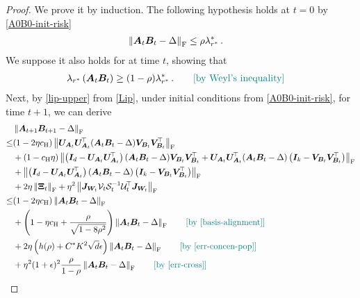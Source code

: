 \begin{proof}
We prove it by induction.
The following hypothesis holds at $t=0$ by \cref{A0B0-init-risk}
    \begin{align*}
        \left\|\bm A_t \bm B_t - \Delta\right\|_{\rm F} & \leq \rho \lambda^*_{r^*}\,.
    \end{align*}
    We suppose it also holds for at time $t$, showing that
    \begin{align*}
        \lambda_{r^*}\left(\bm A_t \bm B_t\right) & \geq (1-\rho)\lambda^*_{r^*}\,. \tag*{\color{teal}[by Weyl's inequality]}
    \end{align*}
    Next, by \cref{lip-upper} from \cref{Lip}, under initial conditions from \cref{A0B0-init-risk},  for time $t+1$, we can derive
    \begin{align*}
        & \left\|\bm A_{t+1}\bm B_{t+1} - \Delta\right\|_{\rm F}\\ 
        \leq & (1-2\eta c_{\rm H})\left\|\bm U_{\bm A_t} \bm U_{\bm A_t}^{\!\top}(\bm A_t \bm B_t - \Delta)\bm V_{\bm B_t} \bm V_{\bm B_t}^{\!\top}\right\|_{\rm F}\nonumber\\
        &  + (1-c_{\rm H}\eta) \left\|\left(\bm I_d - \bm U_{\bm A_t} \bm U_{\bm A_t}^{\!\top}\right)(\bm A_t \bm B_t - \Delta)\bm V_{\bm B_t} \bm V_{\bm B_t}^{\!\top}+\bm U_{\bm A_t} \bm U_{\bm A_t}^{\!\top}(\bm A_t \bm B_t - \Delta)\left(\bm I_k - \bm V_{\bm B_t} \bm V_{\bm B_t}^{\!\top}\right)\right\|_{\rm F}\nonumber\\
        &  + \left\|\left(\bm I_d - \bm U_{\bm A_t} \bm U_{\bm A_t}^{\!\top}\right)(\bm A_t \bm B_t - \Delta)\left(\bm I_k - \bm V_{\bm B_t} \bm V_{\bm B_t}^{\!\top}\right)\right\|_{\rm F}\nonumber\\
        &  + 2\eta\left\|\bm \Xi_t\right\|_{\rm F}+\eta^2\left\|\bm J_{\bm W_t} \mathcal{V}_t \mathcal{S}_t^{-1} \mathcal{U}^{\!\top}_t\bm J_{\bm W_t}\right\|_{\rm F}\\
        \leq & (1-2\eta c_{\rm H})\left\|\bm A_t \bm B_t - \Delta\right\|_{\rm F}\\
        & + \left(1-\eta c_{\rm H}+\frac{\rho}{\sqrt{1-8\rho^2}}\right)\left\|\bm A_t \bm B_t - \Delta\right\|_{\rm F}\tag*{\color{teal}[by \cref{basis-alignment}]}\\
        & + 2\eta\left(h(\rho) + C^* K^2 \sqrt{d} \epsilon\right) \left\|\bm A_t \bm B_t - \Delta\right\|_{\rm F}\tag*{\color{teal}[by \cref{err-concen-pop}]}\\
        & + \eta^2 (1+\epsilon)^2 \frac{\rho}{1-\rho}\left\|\bm A_t\bm B_t-\Delta\right\|_{\rm F}\tag*{\color{teal}[by \cref{err-cross}]}\\

\end{align*}
\end{proof}
